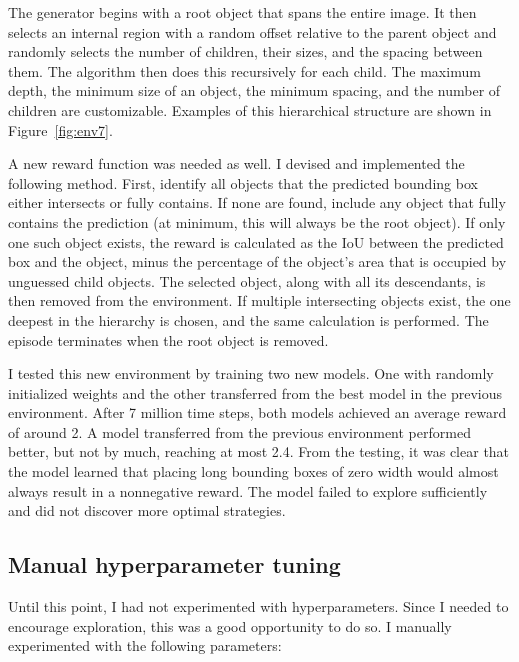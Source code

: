 \documentclass[
  digital,     %
  oneside,     %
  nosansbold,  %
  nocolorbold, %
  lof,         %
  lot,         %
]{fithesis4}
\begin{document}
The generator begins with a root object that spans the entire image. It then selects an internal region with a random offset relative to the parent object and randomly selects the number of children, their sizes, and the spacing between them. The algorithm then does this recursively for each child. The maximum depth, the minimum size of an object, the minimum spacing, and the number of children are customizable. Examples of this hierarchical structure are shown in Figure~\ref{fig:env7}.

A new reward function was needed as well. I devised and implemented the following method. First, identify all objects that the predicted bounding box either intersects or fully contains. If none are found, include any object that fully contains the prediction (at minimum, this will always be the root object). If only one such object exists, the reward is calculated as the IoU between the predicted box and the object, minus the percentage of the object’s area that is occupied by unguessed child objects. The selected object, along with all its descendants, is then removed from the environment. If multiple intersecting objects exist, the one deepest in the hierarchy is chosen, and the same calculation is performed. The episode terminates when the root object is removed.

I tested this new environment by training two new models. One with randomly initialized weights and the other transferred from the best model in the previous environment. After 7 million time steps, both models achieved an average reward of around 2. A model transferred from the previous environment performed better, but not by much, reaching at most 2.4. From the testing, it was clear that the model learned that placing long bounding boxes of zero width would almost always result in a nonnegative reward. The model failed to explore sufficiently and did not discover more optimal strategies.

\subsection{Manual hyperparameter tuning}

Until this point, I had not experimented with hyperparameters. Since I needed to encourage exploration, this was a good opportunity to do so. I manually experimented with the following parameters:
\end{document}

